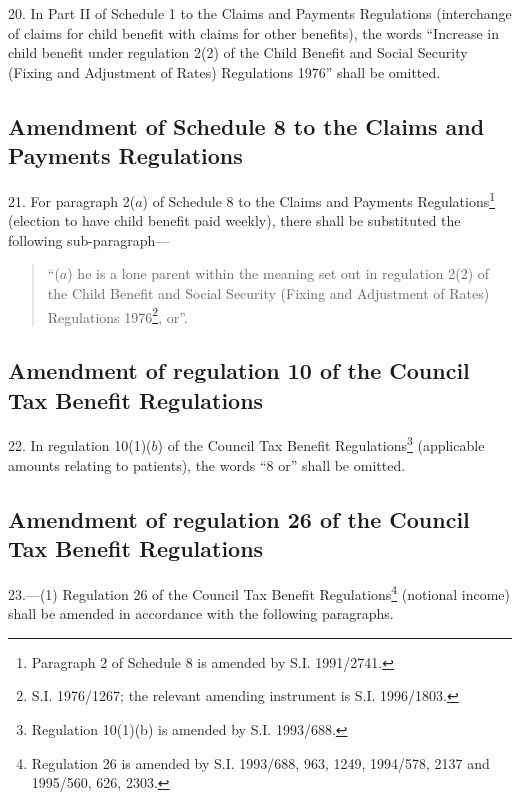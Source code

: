 \documentclass[12pt,a4paper]{article}
\begin{document}
20.  In Part II of Schedule 1 to the Claims and Payments Regulations (interchange of claims for child benefit with claims for other benefits), the words “Increase in child benefit under regulation 2(2) of the Child Benefit and Social Security (Fixing and Adjustment of Rates) Regulations 1976” shall be omitted.

\subsection[21. Amendment of Schedule 8 to the Claims and Payments Regulations]{Amendment of Schedule 8 to the Claims and Payments Regulations}

21.  For paragraph 2($a$) of Schedule 8 to the Claims and Payments Regulations\footnote{\frenchspacing Paragraph 2 of Schedule 8 is amended by S.I. 1991/2741.} (election to have child benefit paid weekly), there shall be substituted the following sub-paragraph—
\begin{quotation}
“($a$) he is a lone parent within the meaning set out in regulation 2(2) of the Child Benefit and Social Security (Fixing and Adjustment of Rates) Regulations 1976\footnote{\frenchspacing S.I. 1976/1267; the relevant amending instrument is S.I. 1996/1803.}, or”.
\end{quotation}

\subsection[22. Amendment of regulation 10 of the Council Tax Benefit Regulations]{Amendment of regulation 10 of the Council Tax Benefit Regulations}

22.  In regulation 10(1)($b$) of the Council Tax Benefit Regulations\footnote{\frenchspacing Regulation 10(1)(b) is amended by S.I. 1993/688.} (applicable amounts relating to patients), the words “8 or” shall be omitted.

\subsection[23. Amendment of regulation 26 of the Council Tax Benefit Regulations]{Amendment of regulation 26 of the Council Tax Benefit Regulations}

23.—(1) Regulation 26 of the Council Tax Benefit Regulations\footnote{\frenchspacing Regulation 26 is amended by S.I. 1993/688, 963, 1249, 1994/578, 2137 and 1995/560, 626, 2303.} (notional income) shall be amended in accordance with the following paragraphs.
\end{document}
